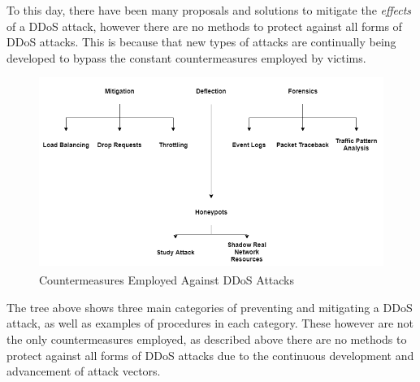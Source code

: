 \raggedright

To this day, there have been many proposals and solutions to mitigate the \textit{effects} of a DDoS attack, however there are no methods to protect against all forms of DDoS attacks.
This is because that new types of attacks are continually being developed to bypass the constant countermeasures employed by victims.

\vspace{0.5cm}

\begin{figure}[h]
	\centering
	\includegraphics[width=0.75\linewidth]{img/ddos_prevention_tree.png}
	\caption{Countermeasures Employed Against DDoS Attacks\textsuperscript{\cite{specht2003taxonomies}}}
\end{figure}

\vspace{0.5cm}

The tree above shows three main categories of preventing and mitigating a DDoS attack, as well as examples of procedures in each category. These however are not the only countermeasures employed, as described above there are no methods to protect against all forms of DDoS attacks due to the continuous development and advancement of attack vectors.